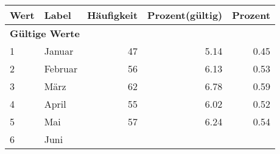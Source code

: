      \begin{longtable}{lXrrr}
     \toprule
     \textbf{Wert} & \textbf{Label} & \textbf{Häufigkeit} & \textbf{Prozent(gültig)} & \textbf{Prozent} \\
     \endhead
     \midrule
     \multicolumn{5}{l}{\textbf{Gültige Werte}}\\

     1 &
     \multicolumn{1}{X}{ Januar   } &


       \num{47} &
       \num[round-mode=places,round-precision=2]{5,14} &
         \num[round-mode=places,round-precision=2]{0,45} \\

     2 &
     \multicolumn{1}{X}{ Februar   } &


       \num{56} &
       \num[round-mode=places,round-precision=2]{6,13} &
         \num[round-mode=places,round-precision=2]{0,53} \\

     3 &
     \multicolumn{1}{X}{ März   } &


       \num{62} &
       \num[round-mode=places,round-precision=2]{6,78} &
         \num[round-mode=places,round-precision=2]{0,59} \\

     4 &
     \multicolumn{1}{X}{ April   } &


       \num{55} &
       \num[round-mode=places,round-precision=2]{6,02} &
         \num[round-mode=places,round-precision=2]{0,52} \\

     5 &
     \multicolumn{1}{X}{ Mai   } &


       \num{57} &
       \num[round-mode=places,round-precision=2]{6,24} &
         \num[round-mode=places,round-precision=2]{0,54} \\

     6 &
     \multicolumn{1}{X}{ Juni   } &



\end{longtable}
